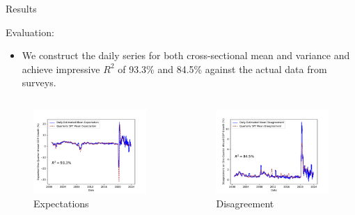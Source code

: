 \documentclass[UTF8, 10pt]{beamer}
\begin{document}
\begin{CJK*}{UTF8}{gbsn}
\begin{frame}{Results}
\begin{itemize}
	\end{itemize}
	Evaluation:
	\begin{itemize}
		\item We construct the daily series for both cross-sectional mean and variance and achieve impressive $R^2$ of 93.3\% and 84.5\% against the actual data from surveys.
	\end{itemize}
	\begin{columns}
		\begin{figure}[htpb]
		  \begin{center}
		    \includegraphics[width=0.8 \linewidth]
		    {pic/Figure_6.pdf}
		    \caption{Expectations}
		  \end{center}
		\end{figure}
		\begin{figure}[htpb]
		  \begin{center}
		    \includegraphics[width=0.8 \linewidth]
		    {pic/Figure_7.pdf}
		    \caption{Disagreement}
		  \end{center}

\end{figure}
\end{columns}
\end{frame}
\end{CJK*}
\end{document}
